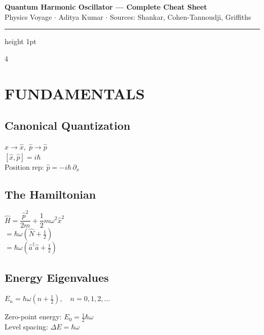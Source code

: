 \documentclass[10pt,landscape,a4paper]{article}
\newcommand{\aop}{\hat{a}}
\newcommand{\adop}{\hat{a}^{\dagger}}
\newcommand{\Nop}{\hat{N}}
\newcommand{\Hop}{\hat{H}}
\newcommand{\xop}{\hat{x}}
\newcommand{\pop}{\hat{p}}
\newcommand{\half}{\tfrac{1}{2}}
\begin{document}

\begin{center}
{\large\bfseries\color{deepviolet} Quantum Harmonic Oscillator — Complete Cheat Sheet}\\[1pt]
{\small\color{gray!60!black} Physics Voyage $\cdot$ Aditya Kumar $\cdot$ Sources: Shankar, Cohen-Tannoudji, Griffiths}
\end{center}
\vspace{2pt}
\hrule height 1pt
\vspace{4pt}

\begin{multicols}{4}

\section{FUNDAMENTALS}

\subsection{Canonical Quantization}
$\xop \to \xop,\; \pop \to \pop$\\
$[\xop,\pop] = i\hbar$\\
Position rep: $\pop = -i\hbar\,\partial_x$

\subsection{The Hamiltonian}
\begin{keybox}
$\Hop = \dfrac{\pop^2}{2m} + \dfrac{1}{2}m\omega^2\xop^2$\\[3pt]
$= \hbar\omega\!\left(\Nop + \half\right)$\\[3pt]
$= \hbar\omega\!\left(\adop\aop + \half\right)$
\end{keybox}

\subsection{Energy Eigenvalues}
\begin{keybox}
$E_n = \hbar\omega\!\left(n + \half\right),\quad n=0,1,2,\ldots$

\medskip
Zero-point energy: $E_0 = \tfrac{1}{2}\hbar\omega$\\
Level spacing: $\Delta E = \hbar\omega$
\end{keybox}


\end{multicols}
\end{document}
